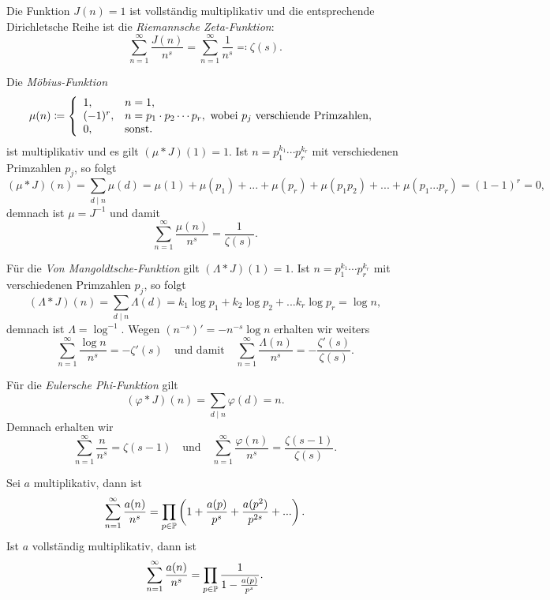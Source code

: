 \begin{example}
    Die Funktion $J(n) = 1$ ist vollständig multiplikativ und die entsprechende Dirichletsche Reihe ist die \emph{Riemannsche Zeta-Funktion}:
    $$ \sum_{n=1}^\infty \frac{J(n)}{n^s} = \sum_{n=1}^\infty \frac{1}{n^s} \eqqcolon \zeta(s). $$
\end{example}

\begin{example}
    Die \emph{Möbius-Funktion}
    $$ \mu(n) \coloneqq \left\{ \begin{array}{ll}
        1, & n = 1, \\
        (-1)^r, & n = p_1 \cdot p_2 \cdots p_r, \textrm{ wobei $p_j$ verschiende Primzahlen}, \\
        0, & \textrm{sonst}.
    \end{array} \right. \\ $$
    ist multiplikativ und es gilt $(\mu \ast J)(1) = 1$. Ist $n = p_1^{k_1} \cdots p_r^{k_r}$ mit verschiedenen Primzahlen $p_j$, so folgt
    $$ (\mu \ast J)(n) = \sum_{d \mid n} \mu(d) = \mu(1) + \mu(p_1) + ... + \mu(p_r) + \mu(p_1 p_2) + ... + \mu(p_1 ... p_r) = (1 - 1)^r = 0, $$
    demnach ist $\mu = J^{-1}$ und damit
    $$ \sum_{n=1}^\infty \frac{\mu(n)}{n^s} = \frac{1}{\zeta(s)}. $$
\end{example}

\begin{example}
    Für die \emph{Von Mangoldtsche-Funktion} gilt $(\Lambda \ast J)(1) = 1$. Ist $n = p_1^{k_1} \cdots p_r^{k_r}$ mit verschiedenen Primzahlen $p_j$, so folgt
    $$ (\Lambda \ast J)(n) = \sum_{d \mid n} \Lambda(d) = k_1 \log p_1 + k_2 \log p_2 + ... k_r \log p_r = \log n, $$
    demnach ist $\Lambda = \log^{-1}$. Wegen $(n^{-s})' = -n^{-s} \log n$ erhalten wir weiters
    $$ \sum_{n=1}^\infty \frac{\log n}{n^s} = -\zeta'(s) \quad \textrm{und damit} \quad \sum_{n=1}^\infty \frac{\Lambda(n)}{n^s} = -\frac{\zeta'(s)}{\zeta(s)}. $$
\end{example}

\begin{example}
    Für die \emph{Eulersche Phi-Funktion} gilt
    $$ (\varphi \ast J)(n) = \sum_{d \mid n} \varphi(d) = n. $$
    Demnach erhalten wir
    $$ \sum_{n=1}^\infty \frac{n}{n^s} = \zeta(s-1) \quad \textrm{und} \quad \sum_{n=1}^\infty \frac{\varphi(n)}{n^s} = \frac{\zeta(s-1)}{\zeta(s)}. $$
\end{example}

\begin{theorem}
    Sei $a$ multiplikativ, dann ist
    $$ \sum_{n=1}^\infty \frac{a(n)}{n^s} = \prod_{p \in \P} \left( 1 + \frac{a(p)}{p^s} + \frac{a(p^2)}{p^{2s}} + ... \right). $$
    Ist $a$ vollständig multiplikativ, dann ist
    $$ \sum_{n=1}^\infty \frac{a(n)}{n^s} = \prod_{p \in \P} \frac{1}{1 - \frac{a(p)}{p^s}}. $$
\end{theorem}

